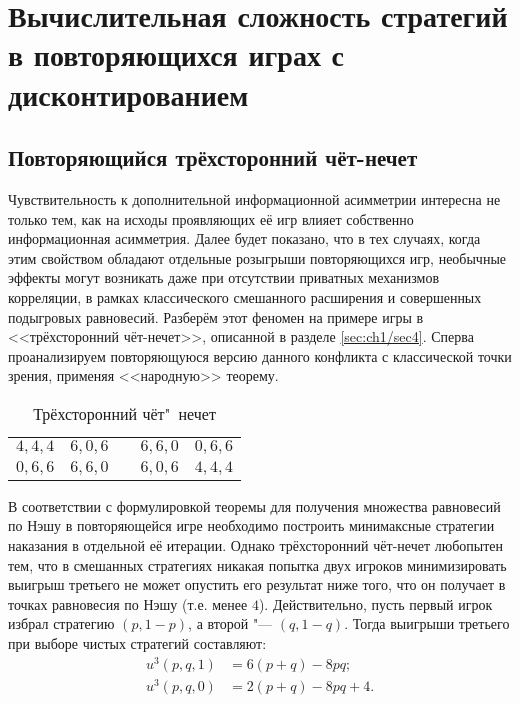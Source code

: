 \chapter{Вычислительная сложность стратегий в повторяющихся играх с дисконтированием}\label{ch:ch3}

\section{Повторяющийся трёхсторонний чёт-нечет}\label{sec:ch3/sect1}

Чувствительность к дополнительной информационной асимметрии интересна не только тем, как на исходы проявляющих её игр влияет собственно информационная асимметрия. Далее будет показано, что в тех случаях, когда этим свойством обладают отдельные розыгрыши повторяющихся игр, необычные эффекты могут возникать даже при отсутствии приватных механизмов корреляции, в рамках классического смешанного расширения и совершенных подыгровых равновесий. Разберём этот феномен на примере игры в <<трёхсторонний чёт-нечет>>, описанной в разделе \ref{sec:ch1/sec4}. Сперва проанализируем повторяющуюся версию данного конфликта с классической точки зрения, применяя <<народную>> теорему.

\begin{table} [htbp]
	\centering
	\begin{threeparttable}
		\caption{Трёхсторонний чёт"~нечет}
		\label{tab:coin3b}
		\begin{tabular}{ |c|c|c|c|c| }
			\cline{1-2} \cline{4-5}
			\rule[-7pt]{0pt}{2em}$4, 4, 4$ &
			\rule[-7pt]{0pt}{2em}$6, 0, 6$ & \qquad\qquad\qquad &
			\rule[-7pt]{0pt}{2em}$6, 6, 0$ &
			\rule[-7pt]{0pt}{2em}$0, 6, 6$ \\
			\cline{1-2} \cline{4-5}
			\rule[-7pt]{0pt}{2em}$0, 6, 6$ &
			\rule[-7pt]{0pt}{2em}$6, 6, 0$ & \qquad\qquad\qquad &
			\rule[-7pt]{0pt}{2em}$6, 0, 6$ &
			\rule[-7pt]{0pt}{2em}$4, 4, 4$ \\
			\cline{1-2} \cline{4-5}
		\end{tabular}
	\end{threeparttable}
\end{table}

В соответствии с формулировкой теоремы для получения множества равновесий по Нэшу в повторяющейся игре необходимо построить минимаксные стратегии наказания в отдельной её итерации. Однако трёхсторонний чёт-нечет любопытен тем, что в смешанных стратегиях никакая попытка двух игроков минимизировать выигрыш третьего не может опустить его результат ниже того, что он получает в точках равновесия по Нэшу (т.е. менее $4$). Действительно, пусть первый игрок избрал стратегию $(p, 1 - p)$, а второй "--- $(q, 1 - q)$. Тогда выигрыши третьего при выборе чистых стратегий составляют:
\begin{align*}
	u^3(p, q, 1) &= 6 (p + q) - 8 p q; \\
	u^3(p, q, 0) &= 2 (p + q) - 8 p q + 4.
\end{align*}

